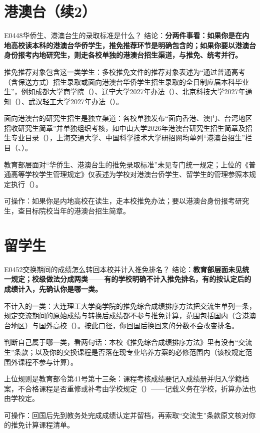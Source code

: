 \section{港澳台（续2）}
\begin{qa}{E0448}{华侨生、港澳台生的录取标准是什么？}
结论：\textbf{分两件事看：如果你是在内地高校读本科的港澳台华侨学生，推免推荐环节是明确包含的；如果你要以港澳台身份报考内地研究生，则走各校单独的港澳台招生渠道，与推免、统考并行。}

推免推荐对象包含这一类学生：多校推免文件的推荐对象表述为“通过普通高考（含保送方式）招生录取或面向港澳台华侨学生招生录取的全日制应届本科毕业生”，例如成都大学商学院（）、辽宁大学2027年办法（）、北京科技大学2027年通知（）、武汉轻工大学2027年办法（）。

面向港澳台的研究生招生是独立渠道：各校单独发布“面向香港、澳门、台湾地区招收研究生简章”并单独组织考核，如中山大学2026年港澳台研究生招生简章及招生专业目录（），上海交通大学、中国科学技术大学研招网均单列“港澳台招生”栏目（、）。

教育部层面对“华侨生、港澳台生的推免录取标准”未见专门统一规定；上位的《普通高等学校学生管理规定》仅表述为学校对港澳台侨学生、留学生的管理参照本规定执行（）。

可操作：如果你是内地高校在读生，走本校推免办法；要以港澳台身份报考研究生，查目标院校当年的港澳台招生简章。
\end{qa}

\section{留学生}
\begin{qa}{E0452}{交换期间的成绩怎么转回本校并计入推免排名？}
结论：\textbf{教育部层面未见统一规定；校级做法分成两类——有的学校明确不计入推免排名，有的按认定后的成绩计入，先确认你是哪一类。}

不计入的一类：大连理工大学商学院的推免综合成绩排序方法把交流生单列一条，规定交流期间的原始成绩与转换后成绩都不参与推免计算，范围包括国内（含港澳台地区）与国外高校（）。按此口径，你回国后换回来的分数不会改变排名。

判断自己属于哪一类，看两句话：本校《推免综合成绩排序方法》里有没有“交流生”条款；以及你的交换课程是否落在现专业培养方案的必修范围内（该校规定范围外课程不参与计算）。

上位规则是教育部令第41号第十三条：课程考核成绩要记入成绩册并归入学籍档案，不合格课程是否重修或补考由学校规定（）——记载义务在学校，折算办法也由学校定。

可操作：回国后先到教务处完成成绩认定并留档，再索取“交流生”条款原文核对你的推免计算课程清单。
\end{qa}

